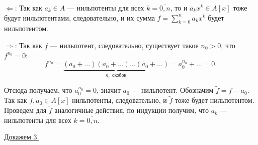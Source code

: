     \begin{Proof}

        $\Leftarrow$: Так как $a_k \in A$ --- нильпотенты для всех $k = \overline{0,n}$, то и $a_kx^k \in A[x]$ тоже будут нильпотентами, следовательно, и их сумма 
        $f = \sum_{k=0}^n a_kx^k$ будет нильпотентом.

        $\Rightarrow$: Так как $f$ --- нильпотент, следовательно, существует такое $n_0 > 0$, что $f^{n_0} = 0$:
        $$
            f^{n_0} = \underbrace{(a_0 + \dots )(a_0 + \dots )\dots (a_0 + \dots )}_{n_0 \text{ скобок}} = a_0^{n_0} + \dots = 0.
        $$

        Отсюда получаем, что $a_0^{n_0} = 0$, значит $a_0$ --- нильпотент.
        Обозначим $\tilde{f} = f - a_0$. Так как $f, a_0 \in A[x]$ нильпотенты, следовательно, и $\tilde{f}$ тоже будет нильпотентом. Проведем для $\tilde{f}$ аналогичные 
        действия, по индукции получим, что $a_k$ --- нильпотенты для всех $k = \overline{0, n}$.
    \end{Proof}
    \underline{Докажем 3.}
